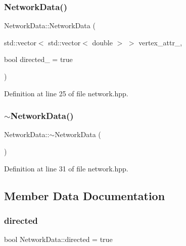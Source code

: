 \subsubsection{\texorpdfstring{Network\+Data()}{NetworkData()}\hspace{0.1cm}{\footnotesize\ttfamily [3/3]}}
{\footnotesize\ttfamily Network\+Data\+::\+Network\+Data (\begin{DoxyParamCaption}\item[{std\+::vector$<$ std\+::vector$<$ double $>$ $>$}]{vertex\+\_\+attr\+\_\+,  }\item[{bool}]{directed\+\_\+ = {\ttfamily true} }\end{DoxyParamCaption})\hspace{0.3cm}{\ttfamily [inline]}}



Definition at line 25 of file network.\+hpp.

\mbox{\label{class_network_data_a4667137d76017d3c69a789ad6cf86931}} 
\subsubsection{\texorpdfstring{$\sim$\+Network\+Data()}{~NetworkData()}}
{\footnotesize\ttfamily Network\+Data\+::$\sim$\+Network\+Data (\begin{DoxyParamCaption}{ }\end{DoxyParamCaption})\hspace{0.3cm}{\ttfamily [inline]}}



Definition at line 31 of file network.\+hpp.



\subsection{Member Data Documentation}
\mbox{\label{class_network_data_a5e67b89f22ad1151680a5f4428c6c780}} 
\subsubsection{\texorpdfstring{directed}{directed}}
{\footnotesize\ttfamily bool Network\+Data\+::directed = true}



